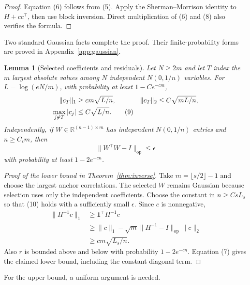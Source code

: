 \documentclass[twoside]{article}
\newtheorem{lemma}[theorem]{Lemma}
\newcommand{\R}{\mathbb R}
\begin{document}
\begin{proof}
Equation (6) follows from (5). Apply the Sherman--Morrison identity to $H+cc^\top$, then use block inversion. Direct multiplication of (6) and (8) also verifies the formula.
\end{proof}

Two standard Gaussian facts complete the proof. Their finite-probability forms are proved in Appendix~\ref{app:gaussian}.

\begin{lemma}[Selected coefficients and residuals]
\label{lem:gaussian}
Let $N\geq2m$ and let $T$ index the $m$ largest absolute values among $N$ independent $N(0,1/n)$ variables. For $L=\log(eN/m)$, with probability at least $1-Ce^{-cm}$,
\begin{align}
 \|c_T\|_1&\geq cm\sqrt{L/n},
 &\|c_T\|_2&\leq C\sqrt{mL/n},\notag\\
 \max_{j\notin T}|c_j|&\leq C\sqrt{L/n}.
 \tag{9}
\end{align}
Independently, if $W\in\R^{(n-1)\times m}$ has independent $N(0,1/n)$ entries and $n\geq C_\epsilon m$, then \[ \|W^\top W-I\|_{\mathrm{op}}\leq\epsilon \tag{10} \] with probability at least $1-2e^{-cn}$.
\end{lemma}

\begin{proof}[Proof of the lower bound in Theorem~\ref{thm:inverse}]
Take $m=\lfloor s/2\rfloor-1$ and choose the largest anchor correlations. The selected $W$ remains Gaussian because selection uses only the independent coefficients. Choose the constant in $n\geq CsL_s$ so that (10) holds with a sufficiently small $\epsilon$. Since $c$ is nonnegative,
\begin{align*}
 \|H^{-1}c\|_1
 &\geq \boldsymbol1^\top H^{-1}c\\
 &\geq \|c\|_1-\sqrt m\|H^{-1}-I\|_{\mathrm{op}}\|c\|_2\\
 &\geq cm\sqrt{L_s/n}.
\end{align*}
Also $r$ is bounded above and below with probability $1-2e^{-cn}$. Equation (7) gives the claimed lower bound, including the constant diagonal term.
\end{proof}

For the upper bound, a uniform argument is needed.
\end{document}

